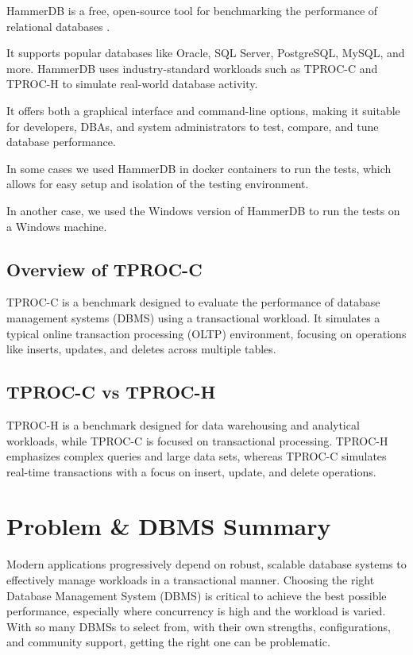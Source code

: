 HammerDB is a free, open-source tool for benchmarking the performance of relational databases \cite{enwiki:1275860580}.

It supports popular databases like Oracle, SQL Server, PostgreSQL, MySQL, and more. HammerDB uses industry-standard workloads such as TPROC-C and TPROC-H to simulate real-world database activity.

It offers both a graphical interface and command-line options, making it suitable for developers, DBAs, and system administrators to test, compare, and tune database performance.

In some cases we used HammerDB in docker containers to run the tests, which allows for easy setup and isolation of the testing environment.

In another case, we used the Windows version of HammerDB to run the tests on a Windows machine.

\subsection{Overview of TPROC-C}
\label{sec:tproc-c}

TPROC-C is a benchmark designed to evaluate the performance of database management systems (DBMS) using a transactional workload. It simulates a typical online transaction processing (OLTP) environment, focusing on operations like inserts, updates, and deletes across multiple tables.

\subsection{TPROC-C vs TPROC-H}
\label{sec:tproc-c-vs-tproc-h}

TPROC-H is a benchmark designed for data warehousing and analytical workloads, while TPROC-C is focused on transactional processing. TPROC-H emphasizes complex queries and large data sets, whereas TPROC-C simulates real-time transactions with a focus on insert, update, and delete operations.


\section{Problem \& DBMS Summary}
\label{sec:problem}
Modern applications progressively depend on robust, scalable database systems to effectively manage workloads in a transactional manner. Choosing the right Database Management System (DBMS) is critical to achieve the best possible performance, especially where concurrency is high and the workload is varied. With so many DBMSs to select from, with their own strengths, configurations, and community support, getting the right one can be problematic.

